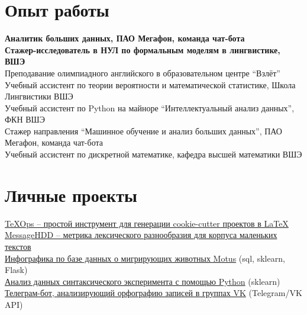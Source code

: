 \documentclass[11pt]{article} %
\begin{document}

\section*{Опыт работы}

 \textbf{Аналитик больших данных, ПАО Мегафон, команда чат-бота}\\
 \textbf{Стажер-исследователь в НУЛ по формальным моделям в лингвистике, ВШЭ}\\
 Преподавание олимпиадного английского в образовательном центре ``Взлёт''\\
 Учебный ассистент по теории вероятности и математической статистике, Школа Лингвистики ВШЭ\\
 Учебный ассистент по Python на майноре ``Интеллектуальный анализ данных'', ФКН ВШЭ\\
 Стажер направления ``Машинное обучение и анализ больших данных'', ПАО Мегафон, команда чат-бота\\
 Учебный ассистент по дискретной математике, кафедра высшей математики ВШЭ



\section*{Личные проекты}

\href{https://github.com/thddbptnsndshs/texops}{TeXOps -- простой инструмент для генерации cookie-cutter проектов в LaTeX}\\
\href{https://github.com/thddbptnsndshs/MessageHDD}{MessageHDD -- метрика лексического разнообразия для корпуса маленьких текстов}\\
\href{https://github.com/thddbptnsndshs/motustoday}{Инфографика по базе данных о мигрирующих животных Motus} (sql, sklearn, Flask)\\
\href{https://github.com/thddbptnsndshs/idioms}{Анализ данных синтаксического эксперимента с помощью Python} (sklearn)\\
\href{https://github.com/thddbptnsndshs/nlzlkskprdstvtljsclnhgrppncnvfrmvgrppvk}{Телеграм-бот, анализирующий орфографию записей в группах VK} (Telegram/VK API)\\
\end{document}

